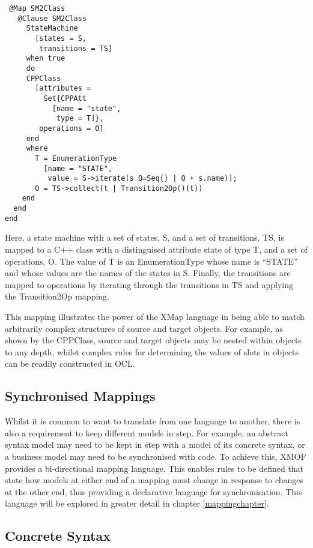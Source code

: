 \small
\begin{verbatim}
 @Map SM2Class
   @Clause SM2Class
     StateMachine
       [states = S,
        transitions = TS]
     when true
     do
     CPPClass
       [attributes =
         Set{CPPAtt
           [name = "state",
            type = T]},
        operations = O]
     end
     where
       T = EnumerationType
         [name = "STATE",
          value = S->iterate(s Q=Seq{} | Q + s.name)];
       O = TS->collect(t | Transition2Op()(t))
    end
  end
end
\end{verbatim}
\normalsize

Here, a state machine with a set of states, S, and a set of
transitions, TS, is mapped to a {C++} class with a distinguised
attribute state of type T, and a set of operations, O. The value
of T is an EnumerationType whose name is ``STATE'' and whose
values are the names of the states in S. Finally, the transitions
are mapped to operations by iterating through the transitions in
TS and applying the Transition2Op mapping.

This mapping illustrates the power of the XMap language in being
able to match arbitrarily complex structures of source and target
objects. For example, as shown by the CPPClass, source and target
objects may be nested within objects to any depth, whilst complex
rules for determining the values of slots in objects can be
readily constructed in OCL.

\subsection{Synchronised Mappings}

Whilst it is common to want to translate from one language to
another, there is also a requirement to keep different models in
step. For example, an abstract syntax model may need to be kept in
step with a model of its concrete syntax, or a business model may
need to be synchronised with code. To achieve this, XMOF provides
a bi-directional mapping language. This enables rules to be
defined that state how models at either end of a mapping must
change in response to changes at the other end, thus providing a
declarative language for synchronisation. This language will be
explored in greater detail in chapter \ref{mappingchapter}.

\subsection{Concrete Syntax}

